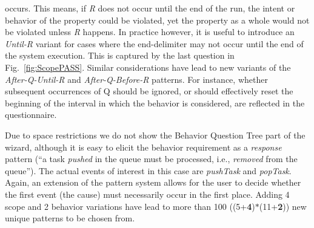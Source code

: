 \documentclass[letter]{llncs}
\begin{document}
occurs. This means, if \emph{R} does not occur until the end of the run, the intent or behavior 
of the property could be violated, yet the property as a whole would not be violated 
unless \emph{R} happens. In practice however, it is useful to introduce an \emph{Until-R} variant for cases where the end-delimiter may not occur until the end of 
the system execution. This is captured by the last question in Fig.~\ref{fig:ScopePASS}.
Similar considerations have lead to new variants of the \emph{After-Q-Until-R} and \emph{After-Q-Before-R} patterns.
For instance, whether subsequent occurrences of Q should be ignored, or should effectively reset the beginning of the interval
in which the behavior is considered, are reflected in the questionnaire.
\vspace{-2 pt}

Due to space restrictions we do not show the Behavior Question Tree part of the wizard, although it is easy to
elicit the behavior requirement as a \emph{response} pattern (``a task \emph{pushed} in the queue must be processed, i.e., \emph{removed} from the queue'').
The actual events of interest in this case are \emph{pushTask} and \emph{popTask}. Again, an extension of the pattern system allows
for the user to decide whether the first event (the cause) must necessarily occur in the first place. 
Adding 4 scope and 2 behavior variations have lead to more than 100 ((5+\textbf{4})$\ast$(11+\textbf{2})) new unique patterns to be chosen from. 
\vspace{-1 pt}
\end{document}
